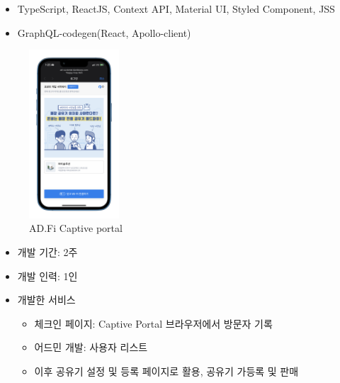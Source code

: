 \begin{itemize}
\begin{itemize}[label=$\star$]
		            \begin{itemize}
			            \item TypeScript, ReactJS, Context API, Material UI, Styled Component, JSS
			            \item GraphQL-codegen(React, Apollo-client)
		            \end{itemize}
	      \end{itemize}
	      \begin{figure}[!ht]
		      \begin{fullwidth}
			      \parbox{1.6\textwidth}{
				      \centering
				      \includegraphics[width=0.3\textwidth]{images/ad-fi-reward.png}
				      \caption*{AD.Fi Captive portal}
			      }
		      \end{fullwidth}
	      \end{figure}
\end{itemize}


\begin{itemize}
	\item 개발 기간: 2주
	\item 개발 인력: 1인
	\item 개발한 서비스
	      \begin{itemize}
		      \item 체크인 페이지: Captive Portal 브라우저에서 방문자 기록
		      \item 어드민 개발: 사용자 리스트
		      \item 이후 공유기 설정 및 등록 페이지로 활용, 공유기 가등록 및 판매
	      \end{itemize}
\end{itemize}

